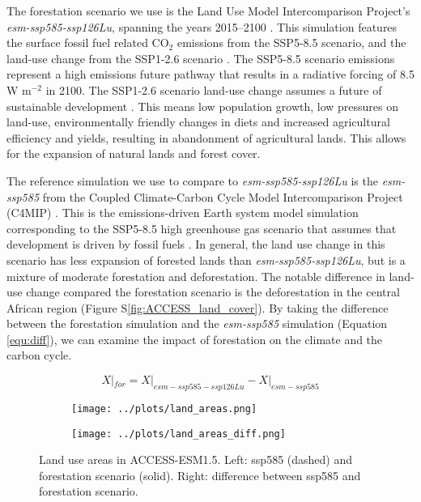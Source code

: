 \documentclass[]{article}
\begin{document}
The forestation scenario we use is the Land Use Model Intercomparison Project's \textit{esm-ssp585-ssp126Lu}, spanning the years 2015--2100 \parencite{lawrence_land_2016}.
This simulation features the surface fossil fuel related CO$_{2}$ emissions from the SSP5-8.5 scenario, and the land-use change from the SSP1-2.6 scenario \parencite{oneill_scenario_2016}.
The SSP5-8.5 scenario emissions represent a high emissions future pathway that results in a radiative forcing of 8.5 W m$^{-2}$ in 2100.
The SSP1-2.6 scenario land-use change assumes a future of sustainable development \parencite{van_vuuren_energy_2017}.
This means low population growth, low pressures on land-use, environmentally friendly changes in diets and increased agricultural efficiency and yields, resulting in abandonment of agricultural lands.
This allows for the expansion of natural lands and forest cover.

The reference simulation we use to compare to \textit{esm-ssp585-ssp126Lu} is the \textit{esm-ssp585} from the Coupled Climate-Carbon Cycle Model Intercomparison Project (C4MIP) \parencite{jones_c4mip_2016}.
This is the emissions-driven Earth system model simulation corresponding to the SSP5-8.5 high greenhouse gas scenario that assumes that development is driven by fossil fuels \parencite{oneill_scenario_2016}.
In general, the land use change in this scenario has less expansion of forested lands than \textit{esm-ssp585-ssp126Lu}, but is a mixture of moderate forestation and deforestation.
The notable difference in land-use change compared the forestation scenario is the deforestation in the central African region (Figure S\ref{fig:ACCESS_land_cover}).
By taking the difference between the forestation simulation and the \textit{esm-ssp585} simulation (Equation \ref{equ:diff}), we can examine the impact of forestation on the climate and the carbon cycle.

\begin{equation}
    X|_{for} = X|_{esm-ssp585-ssp126Lu} - X|_{esm-ssp585}
    \label{equ:diff}
\end{equation}

\begin{figure}[H]
    \centering
    \begin{subfigure}[b]{0.45\linewidth}
        \texttt{[image: ../plots/land\_areas.png]}
    \end{subfigure}
    \begin{subfigure}[b]{0.45\linewidth}

        \texttt{[image: ../plots/land\_areas\_diff.png]}
    \end{subfigure}
    \caption{Land use areas in ACCESS-ESM1.5. Left: ssp585 (dashed) and forestation scenario (solid). Right: difference between ssp585 and forestation scenario.}
    \label{fig:land_use}
\end{figure}
\end{document}
